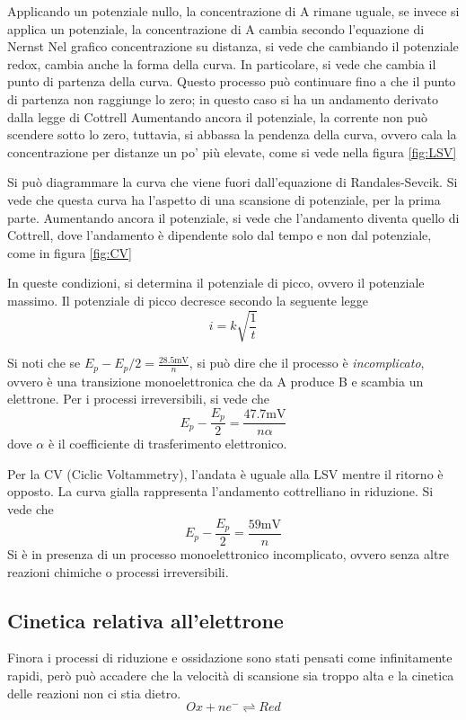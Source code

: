 Applicando un potenziale nullo, la concentrazione di A rimane uguale, se invece si applica un potenziale, la concentrazione di A cambia secondo l'equazione di Nernst
Nel grafico concentrazione su distanza, si vede che cambiando il potenziale redox, cambia anche la forma della curva.
In particolare, si vede che cambia il punto di partenza della curva.
Questo processo può continuare fino a che il punto di partenza non raggiunge lo zero; in questo caso si ha un andamento derivato dalla legge di Cottrell
Aumentando ancora il potenziale, la corrente non può scendere sotto lo zero, tuttavia, si abbassa la pendenza della curva, ovvero cala la concentrazione per distanze un po' più elevate, come si vede nella figura \ref{fig:LSV}


Si può diagrammare la curva che viene fuori dall'equazione di Randales-Sevcik.
Si vede che questa curva ha l'aspetto di una scansione di potenziale, per la prima parte.
Aumentando ancora il potenziale, si vede che l'andamento diventa quello di Cottrell, dove l'andamento è dipendente solo dal tempo e non dal potenziale, come in figura \ref{fig:CV}


In queste condizioni, si determina il potenziale di picco, ovvero il potenziale massimo.
Il potenziale di picco decresce secondo la seguente legge
\[
i = k \sqrt{\frac{1}{t}}
\]

Si noti che se $E_p - E_p / 2 = \frac{28.5 \text{mV}}{n}$, si può dire che il processo è \emph{incomplicato}, ovvero è una transizione monoelettronica che da A produce B e scambia un elettrone.
Per i processi irreversibili, si vede che
\[
E_p - \frac{E_p}{2} = \frac{47.7 \text{mV}}{n \alpha} 
\]
dove $\alpha$ è il coefficiente di trasferimento elettronico.

Per la CV (Ciclic Voltammetry), l'andata è uguale alla LSV mentre il ritorno è opposto.
La curva gialla rappresenta l'andamento cottrelliano in riduzione.
Si vede che
\[
E_p - \frac{E_p}{2} = \frac{59 \text{mV}}{n} 
\]
Si è in presenza di un processo monoelettronico incomplicato, ovvero senza altre reazioni chimiche o processi irreversibili.

\subsection{Cinetica relativa all'elettrone}
Finora i processi di riduzione e ossidazione sono stati pensati come infinitamente rapidi, però può accadere che la velocità di scansione sia troppo alta e la cinetica delle reazioni non ci stia dietro.
\[
Ox + n e^- \rightleftharpoons Red
\]


